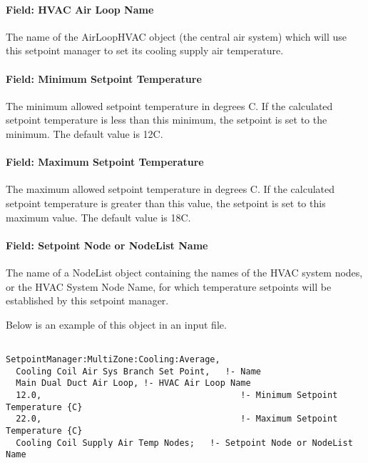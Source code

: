 \paragraph{Field: HVAC Air Loop Name}\label{field-hvac-air-loop-name-4}

The name of the AirLoopHVAC object (the central air system) which will use this setpoint manager to set its cooling supply air temperature.

\paragraph{Field: Minimum Setpoint Temperature}\label{field-minimum-setpoint-temperature-4}

The minimum allowed setpoint temperature in degrees C. If the calculated setpoint temperature is less than this minimum, the setpoint is set to the minimum. The default value is 12C.

\paragraph{Field: Maximum Setpoint Temperature}\label{field-maximum-setpoint-temperature-4}

The maximum allowed setpoint temperature in degrees C. If the calculated setpoint temperature is greater than this value, the setpoint is set to this maximum value. The default value is 18C.

\paragraph{Field: Setpoint Node or NodeList Name}\label{field-setpoint-node-or-nodelist-name-13}

The name of a NodeList object containing the names of the HVAC system nodes, or the HVAC System Node Name, for which temperature setpoints will be established by this setpoint manager.

Below is an example of this object in an input file.

\begin{lstlisting}

SetpointManager:MultiZone:Cooling:Average,
  Cooling Coil Air Sys Branch Set Point,   !- Name
  Main Dual Duct Air Loop, !- HVAC Air Loop Name
  12.0,                                       !- Minimum Setpoint Temperature {C}
  22.0,                                       !- Maximum Setpoint Temperature {C}
  Cooling Coil Supply Air Temp Nodes;   !- Setpoint Node or NodeList Name
\end{lstlisting}

